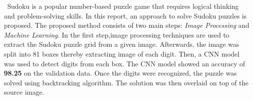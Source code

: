 \ Sudoku is a popular number-based puzzle game that requires logical thinking and problem-solving skills. In this report, an approach to solve Sudoku puzzles is proposed. The proposed method consists of two main steps: \textit{Image Processing} and \textit{Machine Learning}. In the first step,image processing techniques are used to extract the Sudoku puzzle grid from a given image. Afterwards, the image was split into 81 boxes thereby extracting image of each digit. Then, a CNN model was used to detect digits from each box. The CNN model showed an accuracy of \textbf{98.25} on the validation data. Once the digits were recognized, the puzzle was solved using backtracking algorithm.
The solution was then overlaid on top of the source image.

